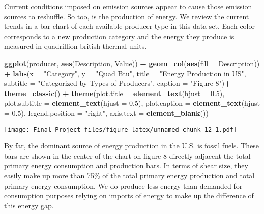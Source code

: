 \documentclass[
]{article}
\newenvironment{Shaded}{\begin{snugshade}}{\end{snugshade}}
\newcommand{\DataTypeTok}[1]{\textcolor[rgb]{0.13,0.29,0.53}{#1}}
\newcommand{\FloatTok}[1]{\textcolor[rgb]{0.00,0.00,0.81}{#1}}
\newcommand{\KeywordTok}[1]{\textcolor[rgb]{0.13,0.29,0.53}{\textbf{#1}}}
\newcommand{\NormalTok}[1]{#1}
\newcommand{\OperatorTok}[1]{\textcolor[rgb]{0.81,0.36,0.00}{\textbf{#1}}}
\newcommand{\StringTok}[1]{\textcolor[rgb]{0.31,0.60,0.02}{#1}}
\begin{document}
Current conditions imposed on emission sources appear to cause those
emission sources to reshuffle. So too, is the production of energy. We
review the current trends in a bar chart of each available producer type
in this data set. Each color corresponds to a new production category
and the energy they produce is measured in quadrillion british thermal
units.

\begin{Shaded}
\begin{Highlighting}[]
\KeywordTok{ggplot}\NormalTok{(producer, }\KeywordTok{aes}\NormalTok{(Description, Value)) }\OperatorTok{+}\StringTok{ }
\StringTok{  }\KeywordTok{geom_col}\NormalTok{(}\KeywordTok{aes}\NormalTok{(}\DataTypeTok{fill =}\NormalTok{ Description)) }\OperatorTok{+}\StringTok{ }
\StringTok{  }\KeywordTok{labs}\NormalTok{(}\DataTypeTok{x =} \StringTok{"Category"}\NormalTok{, }
       \DataTypeTok{y =} \StringTok{"Quad Btu"}\NormalTok{, }
       \DataTypeTok{title =} \StringTok{"Energy Production in US"}\NormalTok{, }
       \DataTypeTok{subtitle =} \StringTok{"Categorized by Types of Producers"}\NormalTok{, }
       \DataTypeTok{caption =} \StringTok{"Figure 8"}\NormalTok{)}\OperatorTok{+}\StringTok{ }
\StringTok{  }\KeywordTok{theme_classic}\NormalTok{() }\OperatorTok{+}\StringTok{ }
\StringTok{  }\KeywordTok{theme}\NormalTok{(}\DataTypeTok{plot.title =} \KeywordTok{element_text}\NormalTok{(}\DataTypeTok{hjust =} \FloatTok{0.5}\NormalTok{),}
        \DataTypeTok{plot.subtitle =} \KeywordTok{element_text}\NormalTok{(}\DataTypeTok{hjust =} \FloatTok{0.5}\NormalTok{),}
        \DataTypeTok{plot.caption =} \KeywordTok{element_text}\NormalTok{(}\DataTypeTok{hjust =} \FloatTok{0.5}\NormalTok{),}
        \DataTypeTok{legend.position =} \StringTok{"right"}\NormalTok{, }
        \DataTypeTok{axis.text =} \KeywordTok{element_blank}\NormalTok{()) }
\end{Highlighting}
\end{Shaded}

\texttt{[image: Final\_Project\_files/figure-latex/unnamed-chunk-12-1.pdf]}

By far, the dominant source of energy production in the U.S. is fossil
fuels. These bars are shown in the center of the chart on figure 8
directly adjacent the total primary energy consumption and production
bars. In terms of shear size, they easily make up more than 75\% of the
total primary energy production and total primary energy consumption. We
do produce less energy than demanded for consumption purposes relying on
imports of energy to make up the difference of this energy gap.
\end{document}
